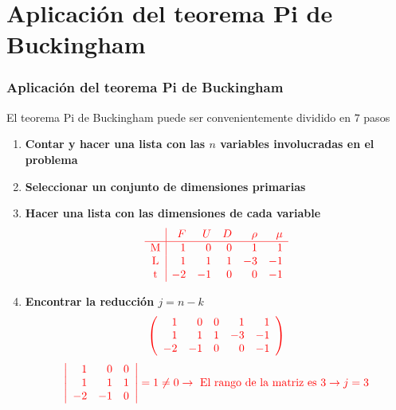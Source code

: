 \documentclass[t]{beamer}
\begin{document}
\section{Aplicación del teorema Pi de Buckingham}
\begin{frame}
\frametitle{Aplicación del teorema Pi de Buckingham}
El teorema Pi de Buckingham puede ser convenientemente dividido en $7$ pasos {\color{red}{(en rojo, la aplicación al ejemplo discutido en la sección anterior)}}

\begin{enumerate}
\item \textbf{Contar y hacer una lista con las $n$ variables involucradas en el problema}\newline
{\color{red}{En el ejemplo anterior existen 5 variables: $F$, $D$, $\mu$, $\rho$ y $U$.}}
\item \textbf{Seleccionar un conjunto de dimensiones primarias}\newline
{}
\item \textbf{Hacer una lista con las dimensiones de cada variable}
$$\color{red}{\begin{array}{c|rrrrr} 
& F & U & D & \rho & \mu \\
\hline \mathrm{M} & 1 & 0 & 0 & 1 & 1 \\
\mathrm{L} & 1 & 1 & 1 & -3 & -1 \\
\mathrm{t} & -2 & -1 & 0 & 0 & -1
\end{array}}
$$
\end{enumerate}

\end{frame}
\begin{frame}
\begin{enumerate}
\setcounter{enumi}{3}
\item \textbf{Encontrar la reducción $j=n-k$}\newline
{\color{red}{Matriz dimensional del proceso (notar que se obtiene a partir de la tabla desarrollada en el paso anterior):}}
$$\color{red}{\left(\begin{array}{rrrrr}1 & 0 & 0 & 1 & 1 \\ 1 & 1 & 1 & -3 & -1 \\ -2 & -1 & 0 & 0 & -1\end{array}\right)}$$  
{\color{red}{La reducción $j$ será equivalente al rango de la matriz dimensional:}}
$$\color{red}{\left|\begin{array}{rrr}1 & 0 & 0 \\ 1 & 1 & 1 \\ -2 & -1 & 0\end{array}\right|=1 \neq 0 \rightarrow \text{ El rango de la matriz es }3 \rightarrow j=3}$$
\end{enumerate}
\end{frame}
\end{document}
